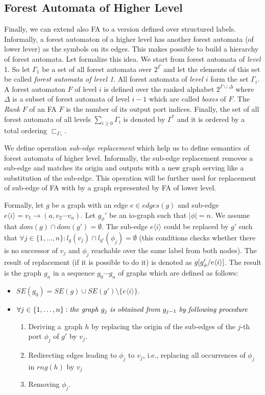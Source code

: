 \subsection{Forest Automata of Higher Level}

Finally, we can extend also FA to a version defined over structured labels.
Informally, a forest automaton of a higher level has another forest automata (of lower lever) as the symbols on its edges.
This makes possible to build a hierarchy of forest automata.
Let formalize this idea.
We start from forest automata of \emph{level} 1.
So let $\Gamma_1$ be a set of all forest automata over $2^\Gamma$ and let the elements of this set be called \emph{forest automata of level 1}.
All forest automata of \emph{level $i$} form the set $\Gamma_i$.
A forest automaton $F$ of level $i$ is defined over the ranked alphabet $2^{\Gamma \cup \Delta}$ where $\Delta$ is a subset of forest automata of
level $i-1$ which are called \emph{boxes} of $F$.
The \emph{Rank} $F$ of an FA $F$ is the number of its output port indices.
Finally, the set of all forest automata of all levels $\sum_{i \geq 0} \Gamma_i$ is denoted by $\Gamma^{*}$ and it is ordered by a total ordering $\sqsubset_{\Gamma_*}$.

We define operation \emph{sub-edge replacement} which help us to define semantics of forest automata of higher level.
Informally, the sub-edge replacement removes a sub-edge and matches its origin and outputs with a new graph serving like a substitution of the sub-edge.
This operation will be further used for replacement of sub-edge of FA with by a graph represented by FA of lower level.

Formally, let $g$ be a graph with an edge $e \in edges(g)$ and sub-edge $e\langle i\rangle = v_1 \rightarrow (a,v_2 \cdots v_n)$.
Let $g_{\phi}'$ be an io-graph such that $|\phi| = n$.
We assume that $dom(g) \cap dom(g') = \emptyset$.
The sub-edge $e\langle i\rangle$ could be replaced by $g'$ such that $\forall j \in \{1,\ldots,n\}: l_{g}(v_j) \cap
l_{g'}(\phi_j) = \emptyset$
(this conditions checks whether there is no successor of $v_j$ and $\phi_j$ reachable over the same
label from both nodes).
The result of replacement (if it is possible to do it) is denoted as $g[g'_\phi/e\langle i\rangle]$.
The result is the graph $g_n$ in a sequence $g_0 \cdots g_n$ of graphs which are defined as follows: 
\begin{itemize}
	\item $SE(g_0) = SE(g) \cup SE(g') \setminus \{e\langle i\rangle\}$.
	\item $\forall j \in \{1, \ldots, n\}: \emph{the graph } g_j \emph{ is obtained from } g_{j-1} \emph{ by following procedure }$
		\begin{enumerate}
			\item Deriving a~graph $h$ by replacing the origin of the sub-edges of the $j$-th port $\phi_j$ of $g'$ by $v_j$.
			\item Redirecting edges leading to $\phi_{j}$ to $v_j$, i.e., replacing all occurrences of $\phi_j$ in $rng(h)$ by $v_j$
			\item Removing $\phi_j$. 
		\end{enumerate}
\end{itemize}

